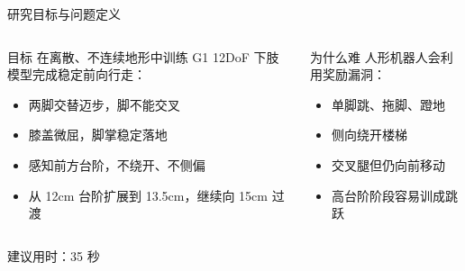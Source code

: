 \documentclass[aspectratio=169,11pt]{ctexbeamer}
\begin{document}
\begin{frame}{研究目标与问题定义}
  \begin{columns}[T,onlytextwidth]
    \begin{block}{目标}
      在离散、不连续地形中训练 G1 12DoF 下肢模型完成稳定前向行走：
      \begin{itemize}
        \item 两脚交替迈步，脚不能交叉
        \item 膝盖微屈，脚掌稳定落地
        \item 感知前方台阶，不绕开、不侧偏
        \item 从 12cm 台阶扩展到 13.5cm，继续向 15cm 过渡
      \end{itemize}
    \end{block}

    \begin{block}{为什么难}
      人形机器人会利用奖励漏洞：
      \begin{itemize}
        \item 单脚跳、拖脚、蹬地
        \item 侧向绕开楼梯
        \item 交叉腿但仍向前移动
        \item 高台阶阶段容易训成跳跃
      \end{itemize}
    \end{block}
  \end{columns}
  \vfill
  {\footnotesize 建议用时：35 秒}
\end{frame}
\end{document}
